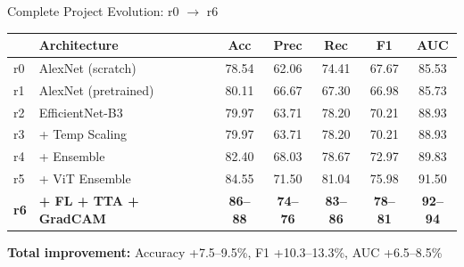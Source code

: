 \documentclass[aspectratio=169]{beamer}
\begin{document}
\begin{frame}{Complete Project Evolution: r0 $\to$ r6}
    \begin{table}
        \centering
        \small
        \renewcommand{\arraystretch}{1.15}
        \begin{tabular}{llccccc}
            \toprule
            & \textbf{Architecture} & \textbf{Acc} & \textbf{Prec} & \textbf{Rec} & \textbf{F1} & \textbf{AUC} \\
            \midrule
            r0 & AlexNet (scratch) & 78.54 & 62.06 & 74.41 & 67.67 & 85.53 \\
            r1 & AlexNet (pretrained) & 80.11 & 66.67 & 67.30 & 66.98 & 85.73 \\
            r2 & EfficientNet-B3 & 79.97 & 63.71 & 78.20 & 70.21 & 88.93 \\
            r3 & + Temp Scaling & 79.97 & 63.71 & 78.20 & 70.21 & 88.93 \\
            r4 & + Ensemble & 82.40 & 68.03 & 78.67 & 72.97 & 89.83 \\
            r5 & + ViT Ensemble & 84.55 & 71.50 & 81.04 & 75.98 & 91.50 \\
            \textbf{r6} & \textbf{+ FL + TTA + GradCAM} & \textbf{86--88} & \textbf{74--76} & \textbf{83--86} & \textbf{78--81} & \textbf{92--94} \\
            \bottomrule
        \end{tabular}
    \end{table}

    \vspace{0.2cm}
    \textbf{Total improvement:} Accuracy +7.5--9.5\%, F1 +10.3--13.3\%, AUC +6.5--8.5\%
\end{frame}
\end{document}
